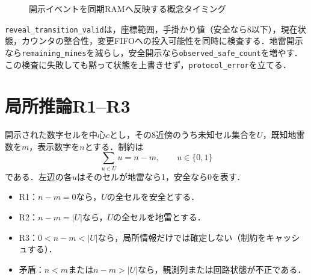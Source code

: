 \begin{figure}[tb]
  \centering
  \caption{開示イベントを同期RAMへ反映する概念タイミング}
  \label{fig:reveal-pipeline}
\end{figure}

\texttt{reveal\_transition\_valid}は，座標範囲，手掛かり値（安全なら8以下），現在状態，カウンタの整合性，変更FIFOへの投入可能性を同時に検査する．地雷開示なら\texttt{remaining\_mines}を減らし，安全開示なら\texttt{observed\_safe\_count}を増やす．この検査に失敗しても黙って状態を上書きせず，\texttt{protocol\_error}を立てる．

\section{局所推論R1--R3}
\label{sec:solver-r123}

開示された数字セルを中心$c$とし，その8近傍のうち未知セル集合を$U$，既知地雷数を$m$，表示数字を$n$とする．制約は
\begin{equation}
  \sum_{u\in U}u=n-m,\qquad u\in\{0,1\}
  \label{eq:local-constraint}
\end{equation}
である．左辺の各$u$はそのセルが地雷なら1，安全なら0を表す．

\begin{itemize}
  \item R1：$n-m=0$なら，$U$の全セルを安全とする．
  \item R2：$n-m=|U|$なら，$U$の全セルを地雷とする．
  \item R3：$0<n-m<|U|$なら，局所情報だけでは確定しない（制約をキャッシュする）．
  \item 矛盾：$n<m$または$n-m>|U|$なら，観測列または回路状態が不正である．
\end{itemize}

